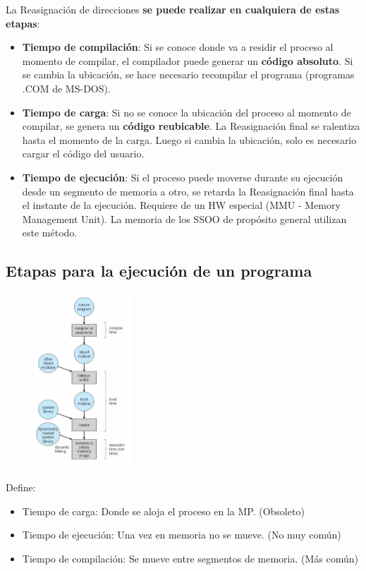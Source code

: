 \documentclass{templateNote}
\begin{document}
La Reasignación de direcciones \textbf{se puede realizar en cualquiera de estas etapas}:
\begin{itemize}
    \item \textbf{Tiempo de compilación}: Si se conoce donde va a residir el proceso al momento de compilar, el compilador puede generar un \textbf{código absoluto}. Si se cambia la ubicación, se hace necesario recompilar el programa (programas .COM de MS-DOS).
    \item \textbf{Tiempo de carga}: Si no se conoce la ubicación del proceso al momento de compilar, se genera un \textbf{código reubicable}. La Reasignación final se ralentiza hasta el momento de la carga. Luego si cambia la ubicación, solo es necesario cargar el código del usuario.
    \item \textbf{Tiempo de ejecución}: Si el proceso puede moverse durante su ejecución desde un segmento de memoria a otro, se retarda la Reasignación final hasta el instante de la ejecución. Requiere de un HW especial (MMU - Memory Management Unit). La memoria de los SSOO de propósito general utilizan este método.
\end{itemize}

\subsection*{Etapas para la ejecución de un programa}
\begin{figure}[H]
    \centering
    \includegraphics[width=0.325\textwidth]{img/cargaprograma.png}
\end{figure}
Define:
\begin{itemize}
    \item Tiempo de carga: Donde se aloja el proceso en la MP. (Obsoleto)
    \item Tiempo de ejecución: Una vez en memoria no se mueve. (No muy común)
    \item Tiempo de compilación: Se mueve entre segmentos de memoria. (Más común)
\end{itemize}
\end{document}
